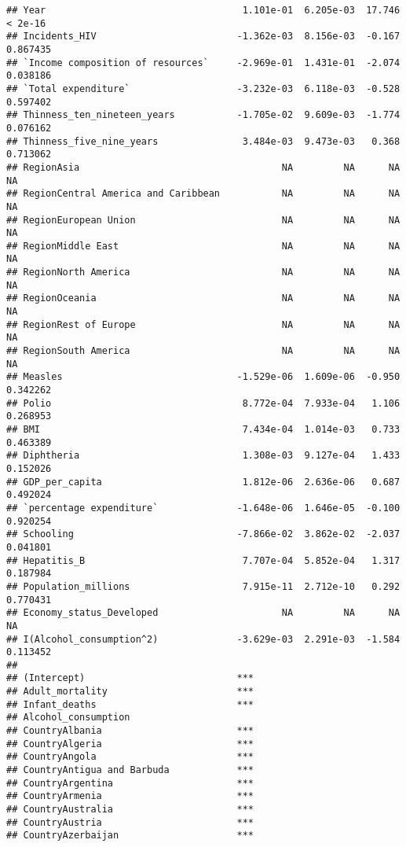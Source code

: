 \documentclass[
]{article}
\begin{document}
\begin{verbatim}
## Year                                   1.101e-01  6.205e-03  17.746  < 2e-16
## Incidents_HIV                         -1.362e-03  8.156e-03  -0.167 0.867435
## `Income composition of resources`     -2.969e-01  1.431e-01  -2.074 0.038186
## `Total expenditure`                   -3.232e-03  6.118e-03  -0.528 0.597402
## Thinness_ten_nineteen_years           -1.705e-02  9.609e-03  -1.774 0.076162
## Thinness_five_nine_years               3.484e-03  9.473e-03   0.368 0.713062
## RegionAsia                                    NA         NA      NA       NA
## RegionCentral America and Caribbean           NA         NA      NA       NA
## RegionEuropean Union                          NA         NA      NA       NA
## RegionMiddle East                             NA         NA      NA       NA
## RegionNorth America                           NA         NA      NA       NA
## RegionOceania                                 NA         NA      NA       NA
## RegionRest of Europe                          NA         NA      NA       NA
## RegionSouth America                           NA         NA      NA       NA
## Measles                               -1.529e-06  1.609e-06  -0.950 0.342262
## Polio                                  8.772e-04  7.933e-04   1.106 0.268953
## BMI                                    7.434e-04  1.014e-03   0.733 0.463389
## Diphtheria                             1.308e-03  9.127e-04   1.433 0.152026
## GDP_per_capita                         1.812e-06  2.636e-06   0.687 0.492024
## `percentage expenditure`              -1.648e-06  1.646e-05  -0.100 0.920254
## Schooling                             -7.866e-02  3.862e-02  -2.037 0.041801
## Hepatitis_B                            7.707e-04  5.852e-04   1.317 0.187984
## Population_millions                    7.915e-11  2.712e-10   0.292 0.770431
## Economy_status_Developed                      NA         NA      NA       NA
## I(Alcohol_consumption^2)              -3.629e-03  2.291e-03  -1.584 0.113452
##                                          
## (Intercept)                           ***
## Adult_mortality                       ***
## Infant_deaths                         ***
## Alcohol_consumption                      
## CountryAlbania                        ***
## CountryAlgeria                        ***
## CountryAngola                         ***
## CountryAntigua and Barbuda            ***
## CountryArgentina                      ***
## CountryArmenia                        ***
## CountryAustralia                      ***
## CountryAustria                        ***
## CountryAzerbaijan                     ***

\end{verbatim}
\end{document}
